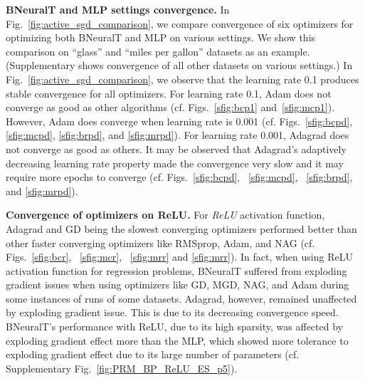 \documentclass[11pt,a4paper]{article}
\begin{document}
    \textbf{BNeuralT and MLP settings convergence.}
    In Fig.~\ref{fig:active_sgd_comparison}, we compare convergence of six optimizers for optimizing both BNeuralT and MLP on various settings. We show this comparison on ``glass'' and ``miles per gallon'' datasets as an example. (Supplementary shows convergence of all other datasets on various settings.) In Fig.~\ref{fig:active_sgd_comparison}, we observe that the learning rate 0.1 produces stable convergence for all optimizers. For learning rate 0.1, Adam does not converge as good as other algorithms (cf. Figs.~\ref{sfig:bcp1} and~\ref{sfig:mcp1}). However, Adam does converge when learning rate is 0.001 (cf. Figs.~\ref{sfig:bcpd}, \ref{sfig:mcpd}, \ref{sfig:brpd}, and \ref{sfig:mrpd}). For learning rate 0.001, Adagrad does not converge as good as others. It may be observed that Adagrad's adaptively decreasing learning rate property made the convergence very slow and it may require more epochs to converge (cf. Figs.~\ref{sfig:bcpd}, ~\ref{sfig:mcpd}, ~\ref{sfig:brpd}, and \ref{sfig:mrpd}). 
    
    \textbf{Convergence of optimizers on ReLU.}
    For \textit{ReLU} activation function, Adagrad and GD being the slowest converging optimizers performed better than other faster converging optimizers like RMSprop, Adam, and NAG (cf. Figs.~\ref{sfig:bcr}, ~\ref{sfig:mcr}, ~\ref{sfig:mrr} and \ref{sfig:mrr}). In fact, when using ReLU activation function for regression problems, BNeuralT suffered from exploding gradient issues when using optimizers like GD, MGD, NAG, and Adam during some instances of runs of some datasets. Adagrad, however, remained unaffected by exploding gradient issue. This is due to its decreasing convergence speed. BNeuralT's performance with ReLU, due to its high sparsity, was affected by exploding gradient effect more than the MLP, which showed more tolerance to exploding gradient effect due to its large number of parameters (cf. Supplementary Fig.~\ref{fig:PRM_BP_ReLU_ES_p5}). 
\end{document}
